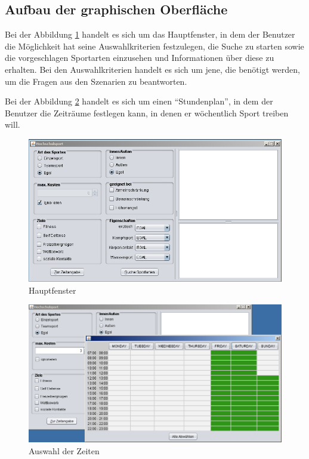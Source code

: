 \subsection{Aufbau der graphischen Oberfläche}

Bei der Abbildung \ref{fig:Hauptfenster} handelt es sich um das Hauptfenster, in dem der Benutzer die Möglichkeit hat seine Auswahlkriterien festzulegen, die Suche zu starten sowie die vorgeschlagen Sportarten einzusehen und Informationen über diese zu erhalten. Bei den Auswahlkriterien handelt es sich um jene, die benötigt werden, um die Fragen aus den Szenarien zu beantworten.

Bei der Abbildung \ref{fig:Auswahl der Zeiten} handelt es sich um einen "`Stundenplan"', in dem der Benutzer die Zeiträume festlegen kann, in denen er wöchentlich Sport treiben will. 



\begin{figure}[p]
\centering
\includegraphics[width=\textwidth]{images/gui.png}%
\caption{Hauptfenster}
\label{fig:Hauptfenster}
\end{figure}

\begin{figure}[p]
\centering
\includegraphics[width=\textwidth]{images/guizeit.png}%
\caption{Auswahl der Zeiten}
\label{fig:Auswahl der Zeiten}
\end{figure}

